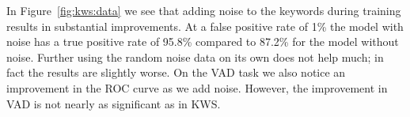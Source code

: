 %

In Figure~\ref{fig:kws:data} we see that adding noise to the keywords during
training results in substantial improvements. At a false positive rate of 1\%
the model with noise has a true positive rate of 95.8\% compared to 87.2\% for
the model without noise. Further using the random noise data on its own does
not help much; in fact the results are slightly worse. On the VAD task we also
notice an improvement in the ROC curve as we add noise. However, the
improvement in VAD is not nearly as significant as in KWS.


